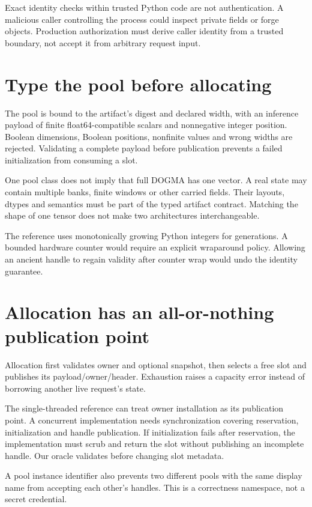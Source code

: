 Exact identity checks within trusted Python code are not authentication.
A malicious caller controlling the process could inspect private fields or
forge objects. Production authorization must derive caller identity from a
trusted boundary, not accept it from arbitrary request input.

\section{Type the pool before allocating}
The pool is bound to the artifact's digest and declared width, with an
inference payload of finite float64-compatible scalars and nonnegative integer
position. Boolean dimensions, Boolean positions, nonfinite values and wrong
widths are rejected. Validating a complete payload before publication prevents
a failed initialization from consuming a slot.

One pool class does not imply that full DOGMA has one vector. A real state may
contain multiple banks, finite windows or other carried fields. Their layouts,
dtypes and semantics must be part of the typed artifact contract. Matching
the shape of one tensor does not make two architectures interchangeable.

The reference uses monotonically growing Python integers for generations.
A bounded hardware counter would require an explicit wraparound policy.
Allowing an ancient handle to regain validity after counter wrap would undo
the identity guarantee.

\section{Allocation has an all-or-nothing publication point}
Allocation first validates owner and optional snapshot, then selects a free
slot and publishes its payload/owner/header. Exhaustion raises a capacity
error instead of borrowing another live request's state.

The single-threaded reference can treat owner installation as its publication
point. A concurrent implementation needs synchronization covering reservation,
initialization and handle publication. If initialization fails after reservation,
the implementation must scrub and return the slot without publishing an
incomplete handle. Our oracle validates before changing slot metadata.

A pool instance identifier also prevents two different pools with the same
display name from accepting each other's handles. This is a correctness
namespace, not a secret credential.

